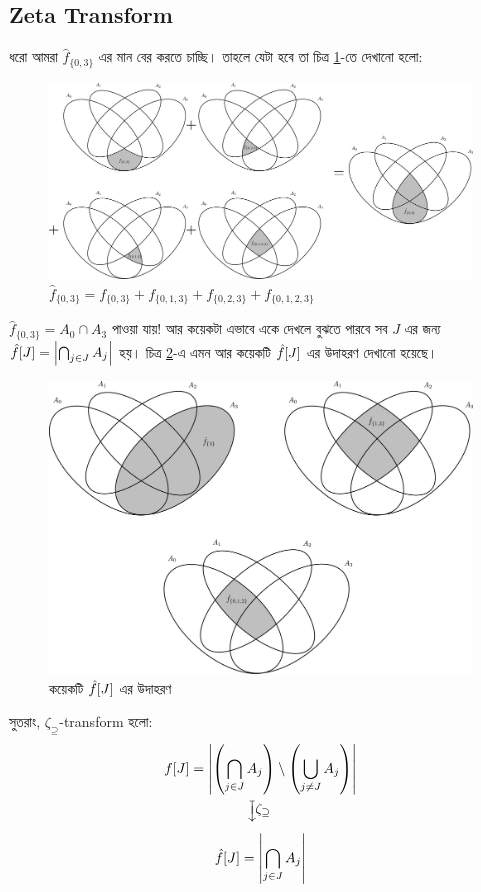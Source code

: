 \subsection{Zeta Transform}
ধরো আমরা $\hat{f}_{\{0,3\}}$ এর মান বের করতে চাচ্ছি। তাহলে যেটা হবে তা
চিত্র \ref{fhat_03_sum}-তে দেখানো হলো:
\begin{figure}[!ht]
  \centering
  \includegraphics[width=\textwidth]{./img/sos-dp/4set/fhat_03_sum.pdf}
  \caption{$\hat{f}_{\{0,3\}} = f_{\{0,3\}} + f_{\{0,1,3\}} +
  f_{\{0,2,3\}} + f_{\{0,1,2,3\}}$}
  \label{fhat_03_sum}
\end{figure}
$\hat{f}_{\{0,3\}} = A_0 \cap A_3$ পাওয়া যায়! আর কয়েকটা এভাবে একে দেখলে
বুঝতে পারবে সব $J$ এর জন্য $\hat{f}[J] = \left| \bigcap_{j \in J} A_j \right|$ হয়।
চিত্র \ref{three_fhat_example}-এ এমন আর কয়েকটি $\hat{f}[J]$ এর উদাহরণ
দেখানো হয়েছে।
\begin{figure}[!ht]
  \centering
  \includegraphics[width%
  =\textwidth]{./img/sos-dp/4set/three_fhat_example.pdf}
  \caption{কয়েকটি $\hat{f}[J]$ এর উদাহরণ}
  \label{three_fhat_example}
\end{figure}
সুতরাং, $\zeta_\supseteq$-transform হলো:
\begin{gather*}
  f\one{J} = \abs{ \pbra{\bigcap_{j \in J} A_j} \setminus
  \pbra{\bigcup_{j \ne J} A_j} }\\
  \rotatebox[origin = c]{-90}{$\xmapsto{\rotatebox[origin =
  c]{90}{$\zeta_\supseteq$}}$}\\
  \hat{f}\one{J} = \abs{ \bigcap_{j \in J} A_j }
\end{gather*}

